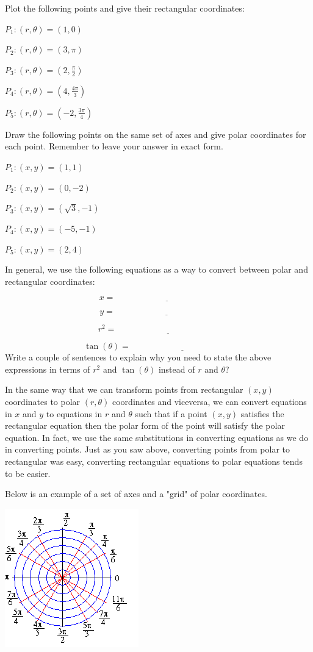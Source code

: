 \bq Plot the following points and give their rectangular coordinates:
\be
\item $P_1:(r, \theta)=(1,0) $
\item $P_2:(r, \theta)=(3,\pi)$
\item $P_3:(r, \theta)=(2,\frac{\pi}{2})$
\item $P_4:(r, \theta)=(4, \frac{4\pi}{3})$
\item $P_5:(r, \theta)=(-2, \frac{3 \pi}{4})$
\ee
\eq

\bq Draw the following points on the same set of axes and give polar coordinates for each point. Remember to leave your answer in exact form.
\be
\item $P_1:(x,y)=(1,1) $
\item $P_2:(x,y)=(0,-2)$
\item $P_3:(x,y)=(\sqrt{3}, -1)$
\item $P_4:(x,y)=(-5,-1)$
\item $P_5:(x,y)=(2,4)$
\ee
\eq

\bq In general, we use the following equations as a way to convert between polar and rectangular coordinates:

$$ x = \underline{\hspace{2in}} $$

$$ y = \underline{\hspace{2in}} $$

$$ r^2 = \underline{\hspace{2in}} $$

$$ \tan(\theta) = \underline{\hspace{2in}} $$
\eq
\bq
Write a couple of sentences to explain why you need to state the above expressions in terms of $r^2$ and $\tan(\theta)$ instead of $r$ and $\theta$?
\eq

In the same way that we can transform points from rectangular $(x,y)$ coordinates to polar $(r,\theta)$ coordinates and viceversa, we can convert equations in $x$ and $y$ to equations in $r$ and $\theta$ such that if a point $(x,y)$ satisfies the rectangular equation then the polar form of the point will satisfy the polar equation. In fact, we use the same substitutions in converting equations as we do in converting points. Just as you saw above, converting points from polar to rectangular was easy, converting rectangular equations to polar equations tends to be easier.

Below is an example of a set of axes and a "grid" of polar coordinates.
\begin{center} \includegraphics{polgrid.png} \end{center}

